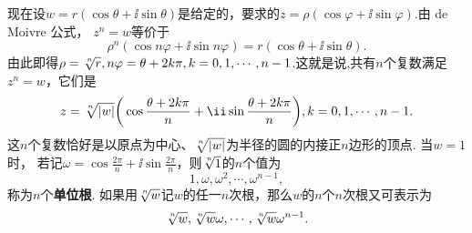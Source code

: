 现在设$w=r(\cos\theta+\ii\sin\theta)$是给定的，要求的$z=\rho(\cos\varphi+\ii\sin\varphi)$.由 de Moivre 公式， $z^n=w$等价于
\[\rho^n(\cos n\varphi+\ii\sin n\varphi)=r(\cos \theta+\ii\sin\theta).\]
由此即得$\rho=\sqrt[\leftroot{-1}\uproot{2} n]r,n\varphi=\theta+2k\pi,k=0,1,\cdots,n-1$.这就是说,共有$n$个复数满足$z^n=w$，它们是
\[z=\sqrt[\leftroot{-1}\uproot{2} n]{|w|}\bigg(\cos\frac{\theta+2k\pi}n+\ii\sin\frac{\theta+2k\pi}n\bigg)
,k=0,1,\cdots,n-1.\]
这$n$个复数恰好是以原点为中心、$\sqrt[\leftroot{-1}\uproot{2} n]{|w|}$为半径的圆的内接正$n$边形的顶点. 当$w=1$时， 若记$\omega=\cos\frac{2\pi}n+\ii\sin\frac{2\pi}n$，则$\sqrt[\leftroot{-1}\uproot{2} n]1$的$n$个值为
\[1,\omega,\omega^2,\cdots,\omega^{n-1},\]
称为$n$个\textbf{单位根}. 如果用$\sqrt[\leftroot{-1}\uproot{2} n]{w}$记$w$的任一$n$次根，那么$w$的$n$个$n$次根又可表示为
\[\sqrt[\leftroot{-1}\uproot{2} n]w,\sqrt[\leftroot{-1}\uproot{2} n]w\omega,\cdots,\sqrt[\leftroot{-1}\uproot{2} n]{w}\omega^{n-1}.\]

